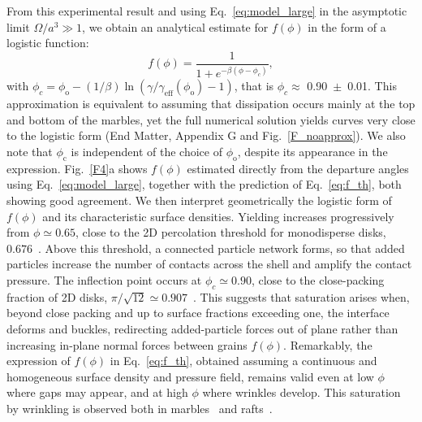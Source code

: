 \documentclass[twocolumn, prl,
 amsmath,amssymb,
 superscriptaddress,aps,
]{revtex4-2}
\begin{document}
From this experimental result and using Eq.~\ref{eq:model_large} in the asymptotic limit $\Omega/a^3\gg 1$, we obtain an analytical estimate for $f(\phi)$ in the form of a logistic function:
\begin{equation}
    f(\phi) = \frac{1}{1+e^{-\beta(\phi-\phi_c)}} ,
    \label{eq:f_th}
\end{equation}
with $\phi_c = \phi_\mathrm{o} - (1/\beta)\ln\left( \gamma/\gamma_\mathrm{eff}(\phi_\mathrm{o})-1\right) $, that is $\phi_c \approx$ 0.90~$\pm$~0.01. This approximation is equivalent to assuming that dissipation occurs mainly at the top and bottom of the marbles, yet the full numerical solution yields curves very close to the logistic form (End Matter, Appendix G and Fig.~\ref{F_noapprox}).
We also note that $\phi_\mathrm{c}$ is independent of the choice of $\phi_\mathrm{o}$, despite its appearance in the expression.
Fig.~\ref{F4}a shows $f(\phi)$ estimated directly from the departure angles using Eq.~\ref{eq:model_large}, together with the prediction of Eq.~\ref{eq:f_th}, both showing good agreement.
We then interpret geometrically the logistic form of $f(\phi)$ and its characteristic surface densities.
Yielding increases progressively from $\phi\simeq0.65$, close to the 2D percolation threshold for monodisperse disks, $0.676$~\cite{quintanilla2000efficient}. Above this threshold, a connected particle network forms, so that added particles increase the number of contacts across the shell and amplify the contact pressure.
The inflection point occurs at $\phi_c\simeq0.90$, close to the close-packing fraction of 2D disks, $\pi/\sqrt{12}\simeq0.907$~\cite{toth2014regular}.
This suggests that saturation arises when, beyond close packing and up to surface fractions exceeding one, the interface deforms and buckles, redirecting added-particle forces out of plane rather than increasing in-plane normal forces between grains $f(\phi)$. 
Remarkably, the expression of $f(\phi)$ in Eq.~\ref{eq:f_th}, obtained assuming a continuous and homogeneous surface density and pressure field, remains valid even at low $\phi$ where gaps may appear, and at high $\phi$ where wrinkles develop. 
This saturation by wrinkling is observed both in marbles~\cite{lagubeau2014armoring} and rafts~\cite{vella2004elasticity,jambon2017wrinkles,protiere2023particle,prakash2024buckling}.
\end{document}
